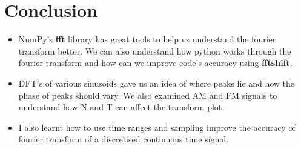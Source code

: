 \documentclass[12pt, a4paper]{report}
\begin{document}
 \section*{Conclusion}
 \begin{itemize}
 	\item NumPy's \textbf{fft} library has great tools to help us understand the fourier transform better. We can also understand how python works through the fourier transform and how can we improve code's accuracy using \textbf{fftshift}.
	\item DFT's of various sinusoids gave us an idea of where peaks lie and how the phase of peaks should vary. We also examined AM and FM signals to understand how N and T can affect the transform plot.
	\item I also learnt how to use time ranges and sampling improve the accuracy of fourier transform of a discretised continuous time signal.
 \end{itemize}
\end{document}
